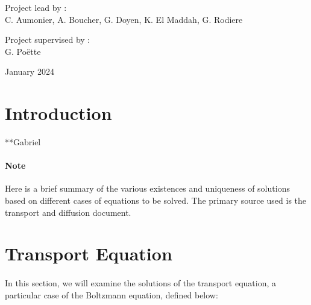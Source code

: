 \documentclass[a4paper, 11pt]{article}
\begin{document}
\begin{titlepage}
		\bigskip
		\bigskip
		
		\centering
		\Large{Project lead by :} \\
		\Large{C. Aumonier, A. Boucher, G. Doyen, K. El Maddah, G. Rodiere}
		
		
		\vfill\vfill\vfill %
		{\Large  Project supervised by :}\\
		\Large{G. Poëtte}
		
		\vspace{0,5cm}
		
		{\large January 2024} %
		
		
		
		
		\vfill %
		
	\end{titlepage}
	
\tableofcontents

\newpage
	
\section{Introduction}

**Gabriel

\paragraph{Note} Here is a brief summary of the various existences and uniqueness of solutions based on different cases of equations to be solved. The primary source used is the transport and diffusion document.

\section{Transport Equation}

\paragraph{}
In this section, we will examine the solutions of the transport equation, a particular case of the Boltzmann equation, defined below:
\end{document}
